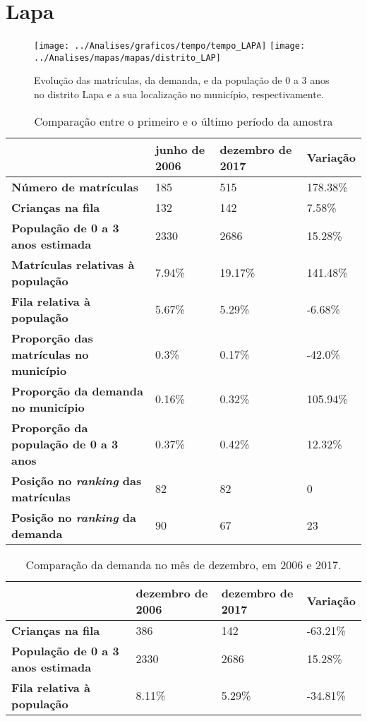 \section{Lapa}
\begin{figure}[H]
\centering
\texttt{[image: ../Analises/graficos/tempo/tempo\_LAPA]}
\texttt{[image: ../Analises/mapas/mapas/distrito\_LAP]}
\caption{Evolução das matrículas, da demanda, e da população de 0 a 3 anos no distrito Lapa e a sua localização no município, respectivamente.}
\end{figure}
\begin{table}[H]
\begin{tabular}{l|l|l|l}
\textbf{}                                      & \textbf{junho de 2006}       & \textbf{dezembro de 2017}    & \textbf{Variação} \\ \hline
\textbf{Número de matrículas}                  & 185 & 515 & 178.38\% \\ \hline
\textbf{Crianças na fila}                      & 132 & 142 & 7.58\% \\ \hline
\textbf{População de 0 a 3 anos estimada}      & 2330 & 2686 & 15.28\% \\ \hline
\textbf{Matrículas relativas à população}      & 7.94\% & 19.17\% & 141.48\% \\ \hline
\textbf{Fila relativa à população}             & 5.67\% & 5.29\% & -6.68\% \\ \hline
\textbf{Proporção das matrículas no município} & 0.3\% & 0.17\% & -42.0\% \\ \hline
\textbf{Proporção da demanda no município}     & 0.16\% & 0.32\% & 105.94\% \\ \hline
\textbf{Proporção da população de 0 a 3 anos}  & 0.37\% & 0.42\% & 12.32\% \\ \hline
\textbf{Posição no \textit{ranking} das matrículas}     & 82 & 82 & 0 \\ \hline
\textbf{Posição no \textit{ranking} da demanda}         & 90 & 67 & 23 \\ 
\end{tabular}
\caption{Comparação entre o primeiro e o último período da amostra}
\end{table}
\begin{table}[H]
\begin{tabular}{l|l|l|l}
\textbf{}                                 & \textbf{dezembro de 2006} & \textbf{dezembro de 2017} & \textbf{Variação} \\ \hline
\textbf{Crianças na fila}                      & 386 & 142 & -63.21\% \\ \hline
\textbf{População de 0 a 3 anos estimada}      & 2330 & 2686 & 15.28\% \\ \hline
\textbf{Fila relativa à população}             & 8.11\% & 5.29\% & -34.81\% \\
\end{tabular}
\caption{Comparação da demanda no mês de dezembro, em 2006 e 2017.}
\end{table}
